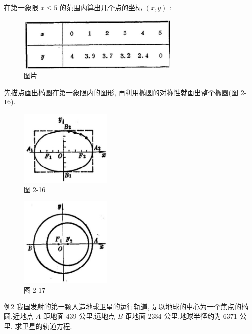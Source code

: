 \documentclass[lang=cn,newtx,10pt,scheme=chinese]{elegantbook}
\begin{document}
在第一象限 \(x \leq 5\) 的范围内算出几个点的坐标 \(\left( {x,y}\right)\) :

\begin{figure}[h]
  \centering
  \includegraphics[max width=0.7\textwidth]{images/01912cc2-ffb6-728e-9ae7-b113ff05c64b_92_362735.jpg}
  \caption{图片}
\end{figure}

先描点画出椭圆在第一象限内的图形, 再利用椭圆的对称性就画出整个椭圆(图 2-16).

\begin{figure}[h]
  \centering
  \includegraphics[max width=0.4\textwidth]{images/01912cc2-ffb6-728e-9ae7-b113ff05c64b_92_523518.jpg}
  \caption{图 2-16}
\end{figure}



\begin{figure}[h]
  \centering
  \includegraphics[max width=0.4\textwidth]{images/01912cc2-ffb6-728e-9ae7-b113ff05c64b_92_511935.jpg}
  \caption{图 2-17}
\end{figure}



例2 我国发射的第一颗人造地球卫星的运行轨道, 是以地球的中心为一个焦点的椭圆,近地点 \(A\) 距地面 439 公里,远地点 \(B\) 距地面 2384 公里,地球半径约为 6371 公里. 求卫星的轨道方程.
\end{document}
